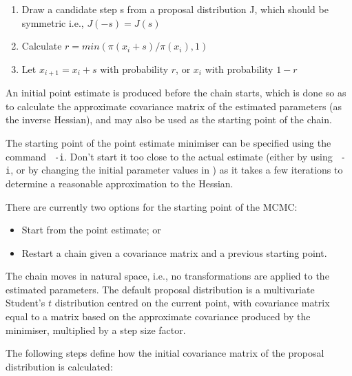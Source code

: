\begin{enumerate}
\item Draw a candidate step s from a proposal distribution J, which should be symmetric i.e., $J(-s)=J(s)$
\item Calculate $r=min(\pi(x_i+s)/\pi(x_i),1)$
\item Let $x_{i+1}=x_i+s$ with probability $r$, or $x_i$ with probability $1-r$
\end{enumerate}

An initial point estimate is produced before the chain starts, which is done so as to calculate the approximate covariance matrix of the estimated parameters (as the inverse Hessian), and may also be used as the starting point of the chain.

The starting point of the point estimate minimiser can be specified using the command \texttt{\cname\ -i}. Don't start it too close to the actual estimate (either by using \texttt{\cname\ -i}, or by changing the initial parameter values in \config) as it takes a few iterations to determine a reasonable approximation to the Hessian.

There are currently two options for the starting point of the MCMC:

\begin{itemize}
\item Start from the point estimate; or
\item Restart a chain given a covariance matrix and a previous starting point.
\end{itemize}

The chain moves in natural space, i.e., no transformations are applied to the estimated parameters. The default proposal distribution is a multivariate Student's $t$ distribution centred on the current point, with covariance matrix equal to a matrix based on the approximate covariance produced by the minimiser, multiplied by a step size factor.

The following steps define how the initial covariance matrix of the proposal distribution is calculated:

